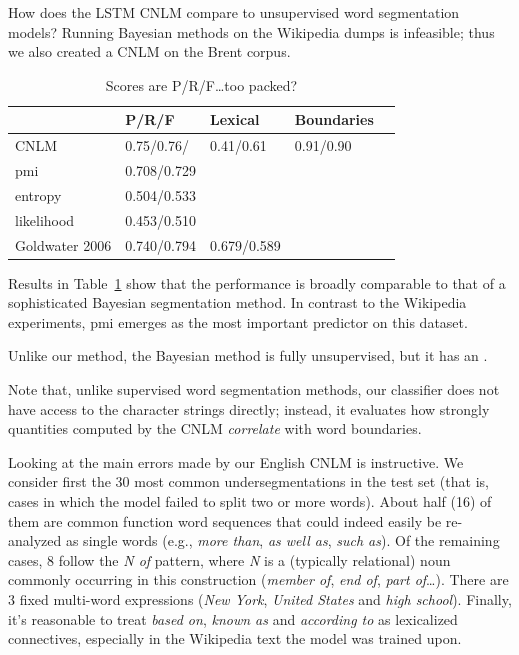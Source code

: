 How does the LSTM CNLM compare to unsupervised word segmentation models?
Running Bayesian methods on the Wikipedia dumps is infeasible; thus we also created a CNLM on the Brent corpus.

\begin{table}[t]
  \begin{center}
    \begin{tabular}{l|l|l|l|l}
      \multicolumn{1}{c}{}&P/R/F & Lexical & Boundaries\\      \hline
      CNLM & 0.75/0.76/ & 0.41/0.61 & 0.91/0.90 \\
     pmi & 0.708/0.729 \\
     entropy & 0.504/0.533 \\
     likelihood & 0.453/0.510 \\
      Goldwater 2006 & 0.740/0.794 & 0.679/0.589
    \end{tabular}
  \end{center}
  \caption{\label{tab:segmentation-results-brent} Scores are P/R/F\ldots too packed?}
\end{table}

Results in Table~\ref{tab:segmentation-results-brent} show that the performance is broadly comparable to that of a sophisticated Bayesian segmentation method.
In contrast to the Wikipedia experiments, pmi emerges as the most important predictor on this dataset.

Unlike our method, the Bayesian method is fully unsupervised, but it has an .

Note that, unlike supervised word segmentation methods, our classifier does not have access to the character strings directly; instead, it evaluates how strongly quantities computed by the CNLM \emph{correlate} with word boundaries.



Looking at the main errors made by our English CNLM is instructive. We
consider first the 30 most common undersegmentations in the test set
(that is, cases in which the model failed to split two or more
words). About half (16) of them are common function word sequences
that could indeed easily be re-analyzed as single words (e.g.,
\emph{more than}, \emph{as well as}, \emph{such as}). Of the remaining
cases, 8 follow the \emph{N of} pattern, where \emph{N} is a
(typically relational) noun commonly occurring in this construction
(\emph{member of}, \emph{end of}, \emph{part of}\ldots). There are 3
fixed multi-word expressions (\emph{New York}, \emph{United States}
and \emph{high school}). Finally, it's reasonable to treat \emph{based
  on}, \emph{known as} and \emph{according to} as lexicalized
connectives, especially in the Wikipedia text the model was trained
upon.

